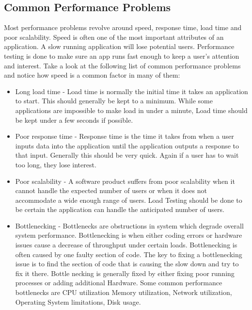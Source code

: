 \documentclass[../thesis.tex]{subfiles}
\begin{document}
\subsection*{Common Performance Problems}
Most performance problems revolve around speed, response time, load time and poor scalability. Speed is often one of the most important attributes of an application. A slow running application will lose potential users. Performance testing is done to make sure an app runs fast enough to keep a user's attention and interest. Take a look at the following list of common performance problems and notice how speed is a common factor in many of them:
\vspace{5mm}
\begin{itemize}
\item Long load time - Load time is normally the initial time it takes an application to start. This should generally be kept to a minimum. While some applications are impossible to make load in under a minute, Load time should be kept under a few seconds if possible.
\vspace{5mm}
\item Poor response time - Response time is the time it takes from when a user inputs data into the application until the application outputs a response to that input. Generally this should be very quick. Again if a user has to wait too long, they lose interest.
\vspace{5mm}
\item Poor scalability - A software product suffers from poor scalability when it cannot handle the expected number of users or when it does not accommodate a wide enough range of users. Load Testing should be done to be certain the application can handle the anticipated number of users.
\vspace{5mm}
\item Bottlenecking - Bottlenecks are obstructions in system which degrade overall system performance. Bottlenecking is when either coding errors or hardware issues cause a decrease of throughput under certain loads. Bottlenecking is often caused by one faulty section of code. The key to fixing a bottlenecking issue is to find the section of code that is causing the slow down and try to fix it there. Bottle necking is generally fixed by either fixing poor running processes or adding additional Hardware. Some common performance bottlenecks are CPU utilization
Memory utilization, Network utilization, Operating System limitations, Disk usage.
\end{itemize}
\end{document}
